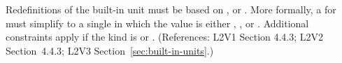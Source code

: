 Redefinitions of the built-in unit  must be based on
,  or .  More formally, a
\UnitDefinition for  must simplify to a single \Unit in which
the   value is either , , or
.  Additional constraints apply if the kind is
 or .    (References: L2V1 Section 4.4.3; L2V2
Section~4.4.3; L2V3 Section~\ref{sec:built-in-units}.)
